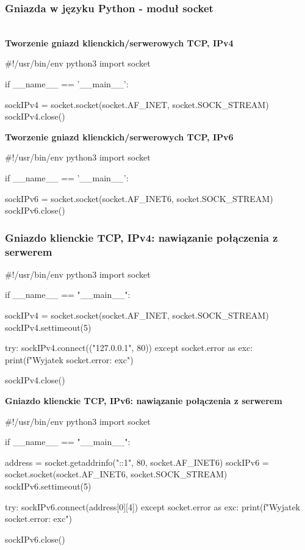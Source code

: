 \subsubsection*{Gniazda w języku Python - moduł socket} \mbox{}\\

\noindent \textbf{Tworzenie gniazd klienckich/serwerowych TCP, IPv4}

\begin{code}
#!/usr/bin/env python3
import socket

if __name__ == '__main__':

	sockIPv4 = socket.socket(socket.AF_INET, socket.SOCK_STREAM)
	sockIPv4.close()
\end{code} 

\noindent \textbf{Tworzenie gniazd klienckich/serwerowych TCP, IPv6}

\begin{code}
#!/usr/bin/env python3
import socket

if __name__ == '__main__':

	sockIPv6 = socket.socket(socket.AF_INET6, socket.SOCK_STREAM)
	sockIPv6.close()
\end{code}  

\subsubsection*{\small Gniazdo klienckie TCP, IPv4: nawiązanie połączenia z serwerem}

\normalsize
\begin{code}
#!/usr/bin/env python3
import socket

if __name__ == "__main__":

    sockIPv4 = socket.socket(socket.AF_INET, socket.SOCK_STREAM)
    sockIPv4.settimeout(5)

    try:
        sockIPv4.connect(("127.0.0.1", 80))
    except socket.error as exc:
        print(f"Wyjatek socket.error: {exc}")

    sockIPv4.close()
\end{code} 

\noindent \textbf{Gniazdo klienckie TCP, IPv6: nawiązanie połączenia z serwerem}

\begin{code}
#!/usr/bin/env python3
import socket

if __name__ == "__main__":

    address = socket.getaddrinfo("::1", 80, socket.AF_INET6)
    sockIPv6 = socket.socket(socket.AF_INET6, socket.SOCK_STREAM)
    sockIPv6.settimeout(5)

    try:
        sockIPv6.connect(address[0][4])
    except socket.error as exc:
        print(f"Wyjatek socket.error: {exc}")

    sockIPv6.close()
\end{code} 

